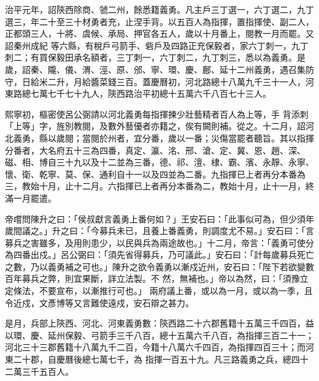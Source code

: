 \begin{pinyinscope}
 治平元年，詔陝西除商、虢二州，餘悉籍義勇。凡主戶三丁選一，六丁選二，九丁選三，年二十至三十材勇者充，止涅手背。以五百人為指揮，置指揮使、副二人，正都頭三人，十將、虞候、承局、押官各五人，歲以十月番上，閱教一月而罷。又詔秦州成紀
 等六縣，有稅戶弓箭手、砦戶及四路正充保毅者，家六丁刺一，九丁刺二；有買保毅田承名額者，三丁刺一，六丁刺二，九丁刺三，悉以為義勇。是歲，詔秦、隴、儀、渭、涇、原、邠、寧、環、慶、鄜、延十二州義勇，遇召集防守，日給米二升，月給醬菜錢三百。蓋慶曆初，河北路總十八萬九千三十一人，河東路總七萬七千七十九人，陝西路治平初總十五萬六千八百七十三人。



 熙寧初，樞密使呂公弼請以河北義勇每指揮揀少壯藝精者百人為上等，手
 背添刺「上等」字，旌別教閱，及數外藝優者亦籍之，俟有闕則補。從之。十二月，詔河北義勇，縣以歲閱；當閱於州者，宜分番，歲以一番；災傷當罷者聽旨。其以指揮分番者，大名府五十三為四番，真定、瀛、洺、邢、滄、定、冀、恩、趙、深、磁、相、博自三十九以及十二並為三番，德、祁、澶、棣、霸、濱、永靜、永寧、懷、衛、乾寧、莫、保、通利自十一以及四並為二番。九指揮已上者再分本番為三，教始十月，止十二月。六指揮已上者再分本番為二，教始十月，止十一月，終
 滿一月罷遣。



 帝嚐問陳升之曰：「侯叔獻言義勇上番何如？」王安石曰：「此事似可為，但少須年歲間議之。」升之曰：「今募兵未已，且養上番義勇，則調度尤不易。」安石曰：「言募兵之害雖多，及用則患少，以民與兵為兩途故也。」十二月，帝言：「義勇可使分為四番出戍。」呂公弼曰：「須先省得募兵，乃可議此。」安石曰：「計每歲募兵死亡之數，乃以義勇補之可也。」陳升之欲令義勇以漸戍近州，安石曰：「陛下若欲變數百年募兵之弊，則宜果斷，詳立法製。不
 然，無補也。」帝以為然，曰：「須豫立定條法，不要宣布，以漸推行可也。」 兩府議上番，或以為一月，或以為一季，且令近戍，文彥博等又言難使遠戍，安石辯之甚力。



 是月，兵部上陝西、河北、河東義勇數：陝西路二十六郡舊籍十五萬三千四百，益以環、慶、延州保毅、弓箭手三千八百，總十五萬六千八百，為指揮三百二十一；河北三十三郡舊籍十八萬九千二百，今籍十八萬六千四百，為指揮四百三十；而河東二十郡，自慶曆後總七萬七千，為
 指揮一百五十九。凡三路義勇之兵，總四十二萬三千五百人。




\end{pinyinscope}
